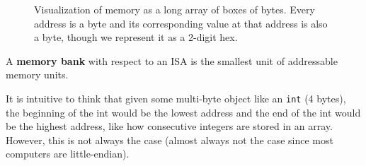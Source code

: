 \begin{figure}[H]
    \caption{Visualization of memory as a long array of boxes of bytes. Every address is a byte and its corresponding value at that address is also a byte, though we represent it as a 2-digit hex. } 
    \label{fig:memory_visual_byte}
  \end{figure}

  \begin{definition}
    \label{def:memory-bank}
    A \textbf{memory bank} with respect to an ISA is the smallest unit of addressable memory units. 
  \end{definition}

  It is intuitive to think that given some multi-byte object like an \texttt{int} (4 bytes), the beginning of the int would be the lowest address and the end of the int would be the highest address, like how consecutive integers are stored in an array. However, this is not always the case (almost always not the case since most computers are little-endian).  

